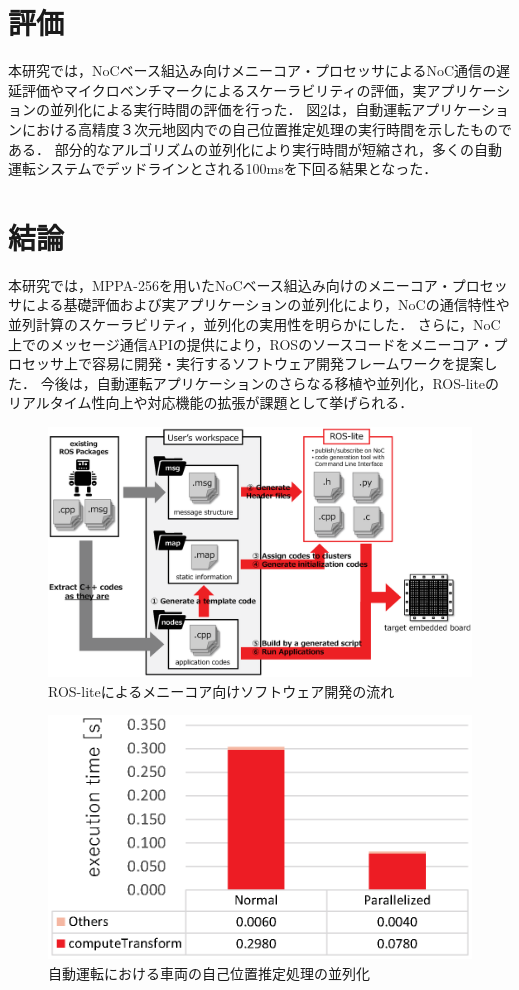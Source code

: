 \documentclass[a4j,10pt,twocolumn]{abstract}
\begin{document}
\section{評価}
本研究では，NoCベース組込み向けメニーコア・プロセッサによるNoC通信の遅延評価やマイクロベンチマークによるスケーラビリティの評価，実アプリケーションの並列化による実行時間の評価を行った．
図\ref{fig:eval}は，自動運転アプリケーションにおける高精度３次元地図内での自己位置推定処理の実行時間を示したものである．
部分的なアルゴリズムの並列化により実行時間が短縮され，多くの自動運転システムでデッドラインとされる100msを下回る結果となった．

\section{結論}
本研究では，MPPA-256を用いたNoCベース組込み向けのメニーコア・プロセッサによる基礎評価および実アプリケーションの並列化により，NoCの通信特性や並列計算のスケーラビリティ，並列化の実用性を明らかにした．
さらに，NoC上でのメッセージ通信APIの提供により，ROSのソースコードをメニーコア・プロセッサ上で容易に開発・実行するソフトウェア開発フレームワークを提案した．
今後は，自動運転アプリケーションのさらなる移植や並列化，ROS-liteのリアルタイム性向上や対応機能の拡張が課題として挙げられる．

\begin{figure}[t]
    \centering
    \includegraphics[width=0.9\linewidth]{../../figure/roslite/system_model.eps}
    \caption{\label{fig:model}
        ROS-liteによるメニーコア向けソフトウェア開発の流れ}
\end{figure}

\begin{figure}[t]
    \centering
    \includegraphics[width=0.9\linewidth]{../../figure/BarGraph_ndt_matching.eps}
    \caption{\label{fig:eval}
    自動運転における車両の自己位置推定処理の並列化}
\end{figure}



  

\newpage
\pagebreak
\end{document}
